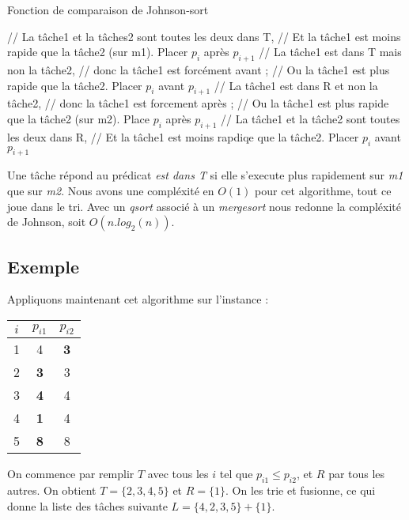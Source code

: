 \begin{algorithm}
\caption{Fonction de comparaison de Johnson-sort}
\begin{algorithmic}
		\STATE // La tâche1 et la tâches2 sont toutes les deux dans T,
		\STATE // Et la tâche1 est moins rapide que la tâche2 (sur m1).
		\STATE Placer $p_i$ après $p_{i+1}$
	\ELSE
		\STATE // La tâche1 est dans T mais non la tâche2,
		\STATE // donc la tâche1 est forcément avant ;
		\STATE // Ou la tâche1 est plus rapide que la tâche2.
		\STATE Placer $p_i$ avant $p_{i+1}$
	\ENDIF
\ELSE
		\STATE // La tâche1 est dans R et non la tâche2,
		\STATE // donc la tâche1 est forcement après ;
		\STATE // Ou la tâche1 est plus rapide que la tâche2 (sur m2).
		\STATE Place $p_i$ après $p_{i+1}$
	\ELSE
		\STATE // La tâche1 et la tâche2 sont toutes les deux dans R,
		\STATE // Et la tâche1 est moins rapdiqe que la tâche2.
		\STATE Placer $p_i$ avant $p_{i+1}$
	\ENDIF
\ENDIF
\end{algorithmic}
\end{algorithm}

Une tâche répond au prédicat {\em est dans T} si elle s'execute plus rapidement
sur {\em m1} que sur {\em m2}.
Nous avons une compléxité en $O(1)$ pour cet algorithme, tout ce joue dans le
tri. Avec un {\em qsort} associé à un {\em mergesort} nous redonne la compléxité
de Johnson, soit $O(n.log_2(n))$.


\subsection{Exemple}
Appliquons maintenant cet algorithme sur l'instance :

\begin{center}
\begin{tabular}{|c|c|c|}
\hline
$i$ & $p_{i1}$ & $p_{i2}$ \\
\hline
1 & 4 & \textbf{3} \\
\hline
2 & \textbf{3} & 3 \\
\hline
3 & \textbf{4} & 4 \\
\hline
4 & \textbf{1} & 4 \\
\hline
5 & \textbf{8} & 8 \\
\hline
\end{tabular}
\end{center}

On commence par remplir $T$ avec tous les $i$ tel que $p_{i1} \le p_{i2}$, et
$R$ par tous les autres.
On obtient $T = \{2,3,4,5\}$ et $R = \{1\}$.
On les trie et fusionne, ce qui donne la liste des tâches 
suivante $L = \{4,2,3,5\} + \{1\}$.
